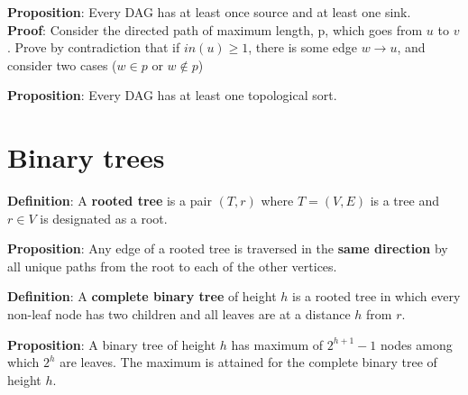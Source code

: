 \begin{framed}
   \textbf{Proposition}: Every DAG has at least once source and at least one sink. \\

   \textbf{Proof}: Consider the directed path of maximum length, p, which goes from $u$ to $v$. Prove by contradiction that if $in(u) \geq 1$, there is some edge $w \rightarrow u$, and consider two cases ($w \in p$ or $w \notin p$)
\end{framed}


\begin{framed}
   \textbf{Proposition}: Every DAG has at least one topological sort. 
  
\end{framed}


\section{Binary trees}
\begin{framed}
   \textbf{Definition}: A \textbf{rooted tree} is a pair $(T, r)$ where $T = (V, E)$ is a tree and $r \in V$ is designated as a root. 
\end{framed}

\begin{framed}
   \textbf{Proposition}: Any edge of a rooted tree is traversed in the \textbf{same direction} by all unique paths from the root to each of the other vertices. 
\end{framed}

\begin{framed}
   \textbf{Definition}:  A \textbf{complete binary tree} of height $h$ is a rooted tree in which every non-leaf node has two children and all leaves are at a distance $h$ from $r$. 
\end{framed}

\begin{framed}
   \textbf{Proposition}: A binary tree of height $h$ has maximum of $2^{h + 1 } - 1$ nodes among which $2^h$ are leaves. The maximum is attained for the complete binary tree of height $h$. 
\end{framed}















